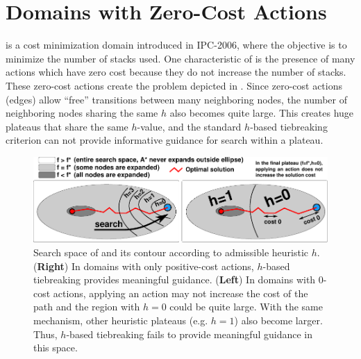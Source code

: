 \section{Domains with Zero-Cost Actions}
\label{sec:zerocost-domains}
  is a cost
minimization domain introduced in IPC-2006, where the objective is to 
minimize the number of stacks used.
One characteristic of  is the presence of many  actions which have zero cost because they do not increase the number of stacks. These zero-cost actions create the problem depicted in .
Since zero-cost actions (edges) allow ``free'' transitions between many neighboring nodes,
the number of neighboring nodes sharing the same $h$ also becomes quite large.
This creates huge plateaus that share the same $h$-value, and the standard $h$-based tiebreaking criterion can not provide informative guidance for search within a plateau.

\begin{figure}[htbp]
  \centering
  \includegraphics{img/astar/plateau-1.pdf}
 \caption{Search space of \astar and its contour according to admissible heuristic $h$. (\textbf{Right}) In domains with only positive-cost actions, $h$-based tiebreaking provides meaningful guidance. (\textbf{Left}) In domains with 0-cost actions, applying an action may not increase the cost of the path and the region with $h=0$ could be quite large. With the same mechanism, other heuristic plateaus (e.g. $h=1$) also become larger. Thus, $h$-based tiebreaking fails to provide meaningful guidance in this space.
  }
 \label{fig:plateau-1}
\end{figure}



